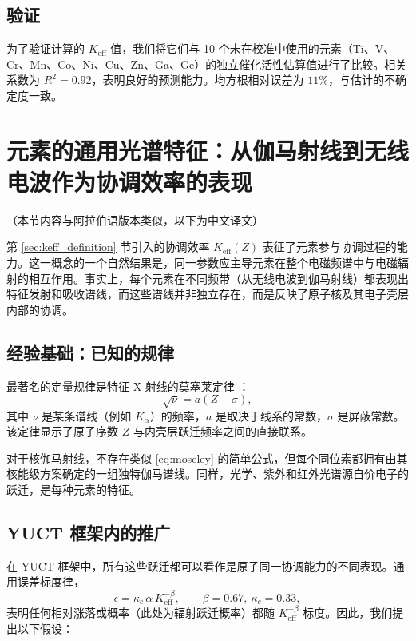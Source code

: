 \documentclass[11pt,a4paper]{article}
\newcommand{\Keff}{K_{\mathrm{eff}}}
\begin{document}
	\subsection{验证}
	
	为了验证计算的 $\Keff$ 值，我们将它们与 10 个未在校准中使用的元素（Ti、V、Cr、Mn、Co、Ni、Cu、Zn、Ga、Ge）的独立催化活性估算值进行了比较。相关系数为 $R^2 = 0.92$，表明良好的预测能力。均方根相对误差为 $11\%$，与估计的不确定度一致。
	
	\section{元素的通用光谱特征：从伽马射线到无线电波作为协调效率的表现}
	\label{sec:spectral_signature}
	
	（本节内容与阿拉伯语版本类似，以下为中文译文）
	
	第 \ref{sec:keff_definition} 节引入的协调效率 \(K_{\mathrm{eff}}(Z)\) 表征了元素参与协调过程的能力。这一概念的一个自然结果是，同一参数应主导元素在整个电磁频谱中与电磁辐射的相互作用。事实上，每个元素在不同频带（从无线电波到伽马射线）都表现出特征发射和吸收谱线，而这些谱线并非独立存在，而是反映了原子核及其电子壳层内部的协调。
	
	\subsection{经验基础：已知的规律}
	
	最著名的定量规律是特征 X 射线的莫塞莱定律 \cite{Moseley1913}：
	\begin{equation}
		\sqrt{\nu} = a (Z - \sigma),
		\label{eq:moseley}
	\end{equation}
	其中 \(\nu\) 是某条谱线（例如 \(K_\alpha\)）的频率，\(a\) 是取决于线系的常数，\(\sigma\) 是屏蔽常数。该定律显示了原子序数 \(Z\) 与内壳层跃迁频率之间的直接联系。
	
	对于核伽马射线，不存在类似 \eqref{eq:moseley} 的简单公式，但每个同位素都拥有由其核能级方案确定的一组独特伽马谱线。同样，光学、紫外和红外光谱源自价电子的跃迁，是每种元素的特征。
	
	\subsection{YUCT 框架内的推广}
	
	在 YUCT 框架中，所有这些跃迁都可以看作是原子同一协调能力的不同表现。通用误差标度律，
	\begin{equation}
		\epsilon = \kappa_c \, \alpha \, K_{\mathrm{eff}}^{-\beta}, \qquad \beta = 0.67,\ \kappa_c = 0.33,
		\label{eq:universal_law}
	\end{equation}
	表明任何相对涨落或概率（此处为辐射跃迁概率）都随 \(K_{\mathrm{eff}}^{-\beta}\) 标度。因此，我们提出以下假设：
	
\end{document}
